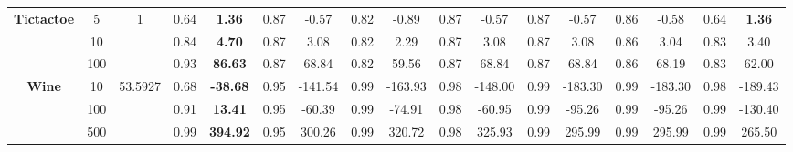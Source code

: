 \documentclass[letterpaper]{article}
\theoremstyle{definition}
\begin{document}
\begin{table}[t]
\begin{tabular}{|c|c|c|c|c|c|c|c|c|c|c|c|c|c|c|c|c|}
\multirow{3}{*}{\textbf{Tictactoe}} & 5        & 1        & 0.64  & \textbf{1.36}    & 0.87  & -0.57            & 0.82   & -0.89             & 0.87      & -0.57        & 0.87  & -0.57            & 0.86     & -0.58              & 0.64   & \textbf{1.36}    \\ \cline{2-17} 
                                    & 10       &          & 0.84  & \textbf{4.70}    & 0.87  & 3.08             & 0.82   & 2.29              & 0.87      & 3.08         & 0.87  & 3.08             & 0.86     & 3.04               & 0.83   & 3.40             \\ \cline{2-17} 
                                    & 100      &          & 0.93  & \textbf{86.63}   & 0.87  & 68.84            & 0.82   & 59.56             & 0.87      & 68.84        & 0.87  & 68.84            & 0.86     & 68.19              & 0.83   & 62.00            \\ \hline
\multirow{3}{*}{\textbf{Wine}}      & 10       & 53.5927  & 0.68  & \textbf{-38.68}  & 0.95  & -141.54          & 0.99   & -163.93           & 0.98      & -148.00      & 0.99  & -183.30          & 0.99     & -183.30            & 0.98   & -189.43          \\ \cline{2-17} 
                                    & 100      &          & 0.91  & \textbf{13.41}   & 0.95  & -60.39           & 0.99   & -74.91            & 0.98      & -60.95       & 0.99  & -95.26           & 0.99     & -95.26             & 0.99   & -130.40          \\ \cline{2-17} 
                                    & 500      &          & 0.99  & \textbf{394.92}  & 0.95  & 300.26           & 0.99   & 320.72            & 0.98      & 325.93       & 0.99  & 295.99           & 0.99     & 295.99             & 0.99   & 265.50           \\ \hline


\end{tabular}
\end{table}
\end{document}

